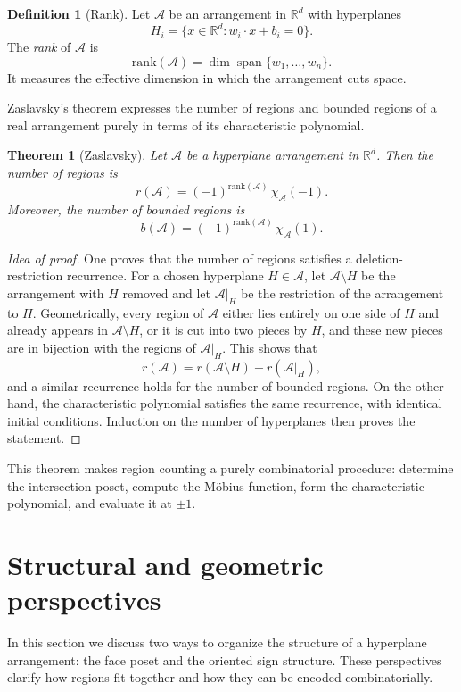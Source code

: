 \documentclass[12pt]{amsart}
\theoremstyle{plain}
\newtheorem{theorem}{Theorem}[section]
\theoremstyle{definition}
\newtheorem{definition}{Definition}[section]
\theoremstyle{remark}
\newcommand{\R}{\mathbb{R}}
\newcommand{\A}{\mathcal{A}}
\begin{document}
\begin{definition}[Rank]
Let $\A$ be an arrangement in $\R^d$ with hyperplanes
\[
H_i = \{ x \in \R^d : w_i \cdot x + b_i = 0 \}.
\]
The \emph{rank} of $\A$ is
\[
\mathrm{rank}(\A) = \dim \operatorname{span}\{w_1,\dots,w_n\}.
\]
It measures the effective dimension in which the arrangement cuts space.
\end{definition}

Zaslavsky's theorem expresses the number of regions and bounded regions of a real arrangement purely in terms of its characteristic polynomial.

\begin{theorem}[Zaslavsky]
Let $\A$ be a hyperplane arrangement in $\R^d$. Then the number of regions is
\[
r(\A)=(-1)^{\mathrm{rank}(\A)}\, \chi_{\A}(-1).
\]
Moreover, the number of bounded regions is
\[
b(\A)=(-1)^{\mathrm{rank}(\A)}\, \chi_{\A}(1).
\]
\end{theorem}

\begin{proof}[Idea of proof]
One proves that the number of regions satisfies a deletion-restriction recurrence. For a chosen hyperplane $H\in\A$, let $\A \setminus H$ be the arrangement with $H$ removed and let $\A|_H$ be the restriction of the arrangement to $H$. Geometrically, every region of $\A$ either lies entirely on one side of $H$ and already appears in $\A \setminus H$, or it is cut into two pieces by $H$, and these new pieces are in bijection with the regions of $\A|_H$. This shows that
\[
r(\A)=r(\A \setminus H)+r(\A|_H),
\]
and a similar recurrence holds for the number of bounded regions. On the other hand, the characteristic polynomial satisfies the same recurrence, with identical initial conditions. Induction on the number of hyperplanes then proves the statement.
\end{proof}

This theorem makes region counting a purely combinatorial procedure: determine the intersection poset, compute the Möbius function, form the characteristic polynomial, and evaluate it at $\pm 1$.

\section{Structural and geometric perspectives}
In this section we discuss two ways to organize the structure of a hyperplane arrangement: the face poset and the oriented sign structure. These perspectives clarify how regions fit together and how they can be encoded combinatorially.
\end{document}
